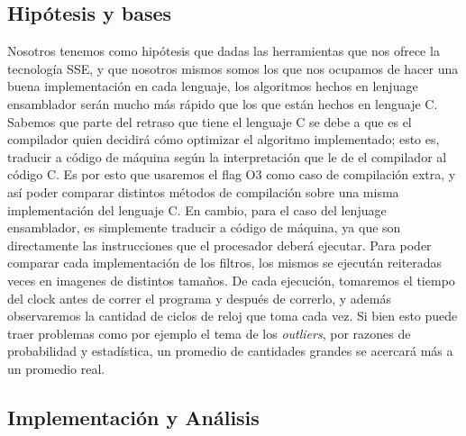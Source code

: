 \documentclass[a4paper]{article}
\begin{document}
\subsection{Hipótesis y bases}
Nosotros tenemos como hipótesis que dadas las herramientas que nos ofrece la tecnología SSE, y que nosotros mismos somos los que nos
ocupamos de hacer una buena implementación en cada lenguaje, los algoritmos hechos en lenjuage ensamblador serán mucho más rápido
que los que están hechos en lenguaje C. Sabemos que parte del retraso que tiene el lenguaje C se debe a que es el compilador quien decidirá cómo
optimizar el algoritmo implementado; esto es, traducir a código de máquina según la interpretación que le de el compilador al código C. Es por esto 
que usaremos el flag O3 como caso de compilación extra, y así poder comparar distintos métodos de compilación sobre una misma 
implementación del lenguaje C.
En cambio, para el caso del lenjuage ensamblador, es simplemente traducir a código de máquina, ya que son directamente las instrucciones
que el procesador deberá ejecutar.
\newline
Para poder comparar cada implementación de los filtros, los mismos se ejecután reiteradas veces en imagenes de distintos tamaños.
De cada ejecución, tomaremos el tiempo del clock antes de correr el programa y después de correrlo, y además observaremos
la cantidad de ciclos de reloj que toma cada vez. Si bien esto puede traer problemas como por ejemplo el tema de los \textit{outliers},
por razones de probabilidad y estadística, un promedio de cantidades grandes se acercará más a un promedio real.

\subsection{Implementación y Análisis}
\end{document}
